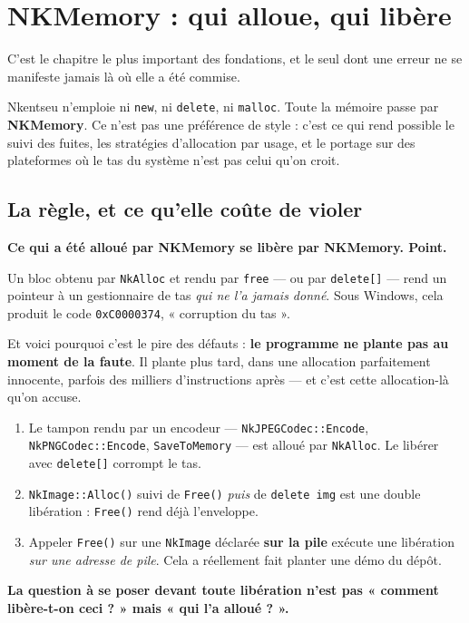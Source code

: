 \chapter{NKMemory : qui alloue, qui libère}

C'est le chapitre le plus important des fondations, et le seul dont une erreur ne
se manifeste jamais là où elle a été commise.

Nkentseu n'emploie ni \texttt{new}, ni \texttt{delete}, ni \texttt{malloc}. Toute
la mémoire passe par \textbf{NKMemory}. Ce n'est pas une préférence de style :
c'est ce qui rend possible le suivi des fuites, les stratégies d'allocation par
usage, et le portage sur des plateformes où le tas du système n'est pas celui
qu'on croit.

\section{La règle, et ce qu'elle coûte de violer}

\begin{nkretenir}
\textbf{Ce qui a été alloué par NKMemory se libère par NKMemory. Point.}

Un bloc obtenu par \texttt{NkAlloc} et rendu par \texttt{free} --- ou par
\texttt{delete[]} --- rend un pointeur à un gestionnaire de tas \emph{qui ne l'a
jamais donné}. Sous Windows, cela produit le code \texttt{0xC0000374},
« corruption du tas ».

Et voici pourquoi c'est le pire des défauts : \textbf{le programme ne plante pas
au moment de la faute}. Il plante plus tard, dans une allocation parfaitement
innocente, parfois des milliers d'instructions après --- et c'est cette
allocation-là qu'on accuse.
\end{nkretenir}

\begin{nkpiege}
\begin{enumerate}
\item Le tampon rendu par un encodeur --- \texttt{NkJPEGCodec::Encode},
      \texttt{NkPNGCodec::Encode}, \texttt{SaveToMemory} --- est alloué par
      \texttt{NkAlloc}. Le libérer avec \texttt{delete[]} corrompt le tas.
\item \texttt{NkImage::Alloc()} suivi de \texttt{Free()} \emph{puis} de
      \texttt{delete img} est une double libération : \texttt{Free()} rend déjà
      l'enveloppe.
\item Appeler \texttt{Free()} sur une \texttt{NkImage} déclarée \textbf{sur la
      pile} exécute une libération \emph{sur une adresse de pile}. Cela a
      réellement fait planter une démo du dépôt.
\end{enumerate}
\textbf{La question à se poser devant toute libération n'est pas « comment
libère-t-on ceci ? » mais « qui l'a alloué ? ».}
\end{nkpiege}

